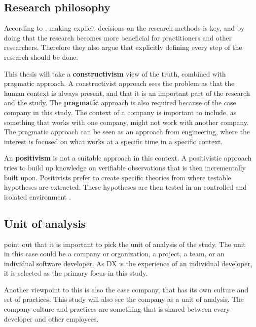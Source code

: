 \documentclass[english, 12pt, a4paper, sci, utf8, a-1b, online]{aaltothesis}
\begin{document}

\subsection{Research philosophy} \label{section:research-philosophy}

According to \cite{easterbrook2008selecting}, making explicit decisions on the research methods is key, and by doing that the research becomes more beneficial for practitioners and other researchers. Therefore they also argue that explicitly defining every step of the research should be done.

This thesis will take a \textbf{constructivism} view of the truth, combined with pragmatic approach. A constructivist approach sees the problem as that the human context is always present, and that it is an important part of the research and the study. The \textbf{pragmatic} approach is also required because of the case company in this study. The context of a company is important to include, as something that works with one company, might not work with another company. The pragmatic approach can be seen as an approach from engineering, where the interest is focused on what works at a specific time in a specific context.

An \textbf{positivism} is not a suitable approach in this context. A positivistic approach tries to build up knowledge on verifiable observations that is then incrementally built upon. Positivists prefer to create specific theories from where testable hypotheses are extracted. These hypotheses are then tested in an controlled and isolated environment \citep{easterbrook2008selecting}.

\subsection{Unit of analysis}

\cite{easterbrook2008selecting} point out that it is important to pick the unit of analysis of the study. The unit in this case could be a company or organization, a project, a team, or an individual software developer. As DX is the experience of an individual developer, it is selected as the primary focus in this study.

Another viewpoint to this is also the case company, that has its own culture and set of practices. This study will also see the company as a unit of analysis. The company culture and practices are something that is shared between every developer and other employees.
\end{document}
